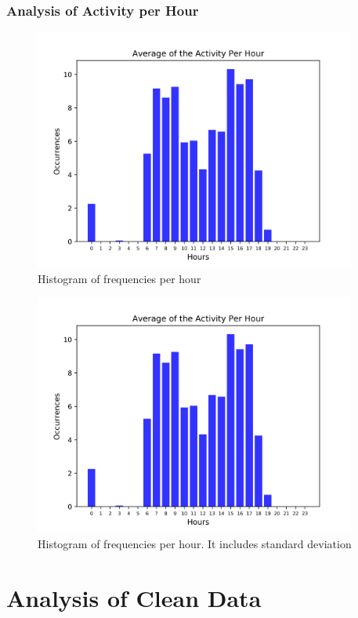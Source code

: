 \documentclass[11pt,fleqn]{book} %
\begin{document}
%
\subsection{Analysis of Activity per Hour}%
\label{subsec:Analysis of Activity per Hour}%


\begin{figure}[h!]%
\centering%
\includegraphics[width=400px]{Pictures/Morelia Hive 1histogramUnclean.png}%
\caption{Histogram of frequencies per hour}%
\end{figure}

%


\begin{figure}[h!]%
\centering%
\includegraphics[width=400px]{Pictures/Morelia Hive 1histogramUnclean.png}%
\caption{Histogram of frequencies per hour. It includes standard deviation}%
\end{figure}

\chapter{Analysis of Clean Data}
\normalsize%
\end{document}
